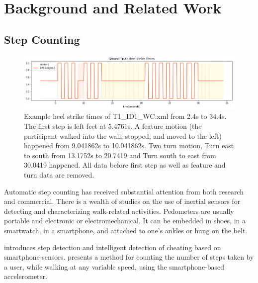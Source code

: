 \documentclass[11pt]{article}
\begin{document}
\section{Background and Related Work}

\subsection{Step Counting}

\begin{figure}[ht]
\centering
\includegraphics[scale=0.5]{ground_truth_2}
\caption{Example heel strike times of T1\_ID1\_WC.xml from 2.4s to 34.4s. The first step is left feet at 5.4761s. A feature motion (the participant walked into the wall, stopped, and moved to the left) happened from 9.041862s to 10.041862s. Two turn motion, Turn east to south from 13.1752s to 20.7419 and Turn south to east from 30.0419 happened. All data before first step as well as feature and turn data are removed.}
\label{fig:ground_truth}
\end{figure}


Automatic step counting has received substantial attention from both research and commercial. There is a wealth of studies on the use of inertial sensors for detecting and characterizing walk-related activities. Pedometers are usually portable and electronic or electromechanical. It can be embedded in shoes, in a smartwatch, in a smartphone, and attached to one’s ankles or hung on the belt.

\cite{tomlein2012advanced} introduces step detection and intelligent detection of cheating based on smartphone sensors.
\cite{naqvib2012step} presents a method for counting the number of steps taken by a user, while walking at any variable speed, using the smartphone-based accelerometer.
\end{document}
